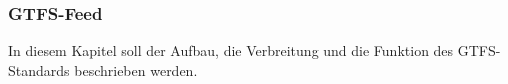 \documentclass[11pt,pdftex,a4paper]{scrartcl}
\begin{document}
	\subsubsection{GTFS-Feed}
	In diesem Kapitel soll der Aufbau, die Verbreitung und die Funktion des GTFS-Standards beschrieben werden.
%	
\end{document}
